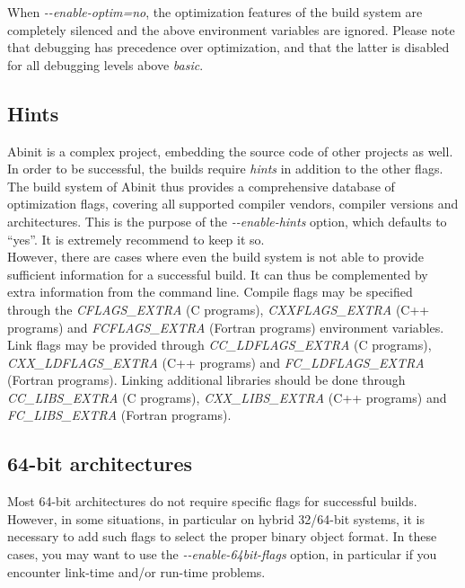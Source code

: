 When \textit{\hbox{-{-}enable-optim=no}}, the optimization features
of the build system are completely silenced and the above environment
variables are ignored. Please note that debugging has precedence over
optimization, and that the latter is disabled for all debugging levels
above \textit{basic}.


\subsection{Hints}

Abinit is a complex project, embedding the source code of other projects
as well. In order to be successful, the builds require \textit{hints}
in addition to the other flags. The build system of Abinit thus provides
a comprehensive database of optimization flags, covering all supported
compiler vendors, compiler versions and architectures. This is the
purpose of the \textit{\hbox{-{-}enable-hints}} option, which
defaults to {}``yes''. It is extremely recommend to keep it so.\\


However, there are cases where even the build system is not able to
provide sufficient information for a successful build. It can thus
be complemented by extra information from the command line. Compile
flags may be specified through the \textit{CFLAGS\_EXTRA} (C programs),
\textit{CXXFLAGS\_EXTRA} (C++ programs) and \textit{FCFLAGS\_EXTRA}
(Fortran programs) environment variables. Link flags may be provided
through \textit{CC\_LDFLAGS\_EXTRA} (C programs), \textit{CXX\_LDFLAGS\_EXTRA}
(C++ programs) and \textit{FC\_LDFLAGS\_EXTRA} (Fortran programs).
Linking additional libraries should be done through \textit{CC\_LIBS\_EXTRA}
(C programs), \textit{CXX\_LIBS\_EXTRA} (C++ programs) and \textit{FC\_LIBS\_EXTRA}
(Fortran programs).


\subsection{64-bit architectures}

Most 64-bit architectures do not require specific flags for successful
builds. However, in some situations, in particular on hybrid 32/64-bit
systems, it is necessary to add such flags to select the proper binary
object format. In these cases, you may want to use the \textit{\hbox{-{-}enable-64bit-flags}}
option, in particular if you encounter link-time and/or run-time problems.\\


